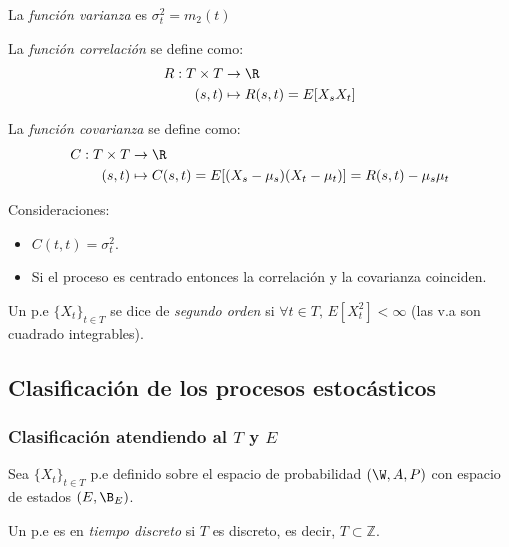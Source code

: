 \begin{ndef}
  La \emph{función varianza} es $\sigma^2_t = m_2(t)$
\end{ndef}

\begin{ndef}
  La \emph{función correlación} se define como:
  \begin{align*}
    R : T \times T & \to \R \\
    (s,t) & \mapsto R(s,t) = E[X_s X_t]
  \end{align*}
\end{ndef}

\begin{ndef}
  La \emph{función covarianza} se define como:
  \begin{align*}
    C: T \times T & \to \R \\
    (s,t) & \mapsto C(s,t) = E[(X_s - \mu_s)(X_t - \mu_t)] = R(s,t) - \mu_s \mu_t
  \end{align*}
\end{ndef}

\begin{nota}
  Consideraciones:
  \begin{itemize}
    \item $C(t,t) = \sigma^2_t$.
    \item Si el proceso es centrado entonces la correlación y la covarianza coinciden.
  \end{itemize}
\end{nota}

\begin{ndef}
  Un p.e $\{X_t\}_{t \in T}$ se dice de \emph{segundo orden} si $\forall t \in T, \, E[X^2_t] < \infty$ (las v.a son cuadrado integrables).
\end{ndef}

\subsection{Clasificación de los procesos estocásticos}

\subsubsection{Clasificación atendiendo al $T$ y $E$}
Sea $\{X_t\}_{t \in T}$ p.e definido sobre el espacio de probabilidad $(\W, A, P)$ con espacio de estados $(E, \B_E)$.

\begin{ndef}
  Un p.e es en \emph{tiempo discreto} si $T$ es discreto, es decir, $T \subset \mathbb{Z}$.
\end{ndef}

